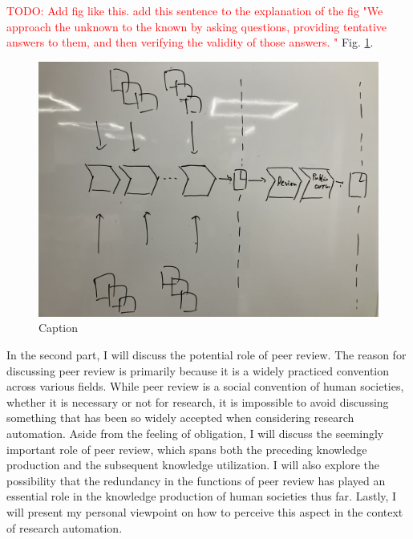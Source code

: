 \documentclass{book}
\begin{document}
\textcolor{red}{TODO: Add fig like this. add this sentence to the explanation of the fig "We approach the unknown to the known by asking questions, providing tentative answers to them, and then verifying the validity of those answers. " } Fig. \ref{fig:research_process}.

\begin{figure}[htb]
    \centering
    \includegraphics[width=\textwidth]{figs/researchprocess.jpg}
    \caption{Caption}
    \label{fig:research_process}
\end{figure}


In the second part, I will discuss the potential role of peer review. The reason for discussing peer review is primarily because it is a widely practiced convention across various fields. While peer review is a social convention of human societies, whether it is necessary or not for research, it is impossible to avoid discussing something that has been so widely accepted when considering research automation. Aside from the feeling of obligation, I will discuss the seemingly important role of peer review, which spans both the preceding knowledge production and the subsequent knowledge utilization. I will also explore the possibility that the redundancy in the functions of peer review has played an essential role in the knowledge production of human societies thus far. Lastly, I will present my personal viewpoint on how to perceive this aspect in the context of research automation.
\end{document}

